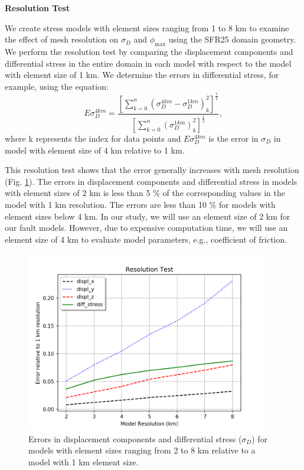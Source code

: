 \documentclass[draft,jgrga]{agutexSI2019}
\begin{document}
\begin{article}
\noindent\textbf{Resolution Test}
\vspace{10mm}

We create stress models with element sizes ranging from 1 to 8 km to examine the effect of mesh resolution on $\sigma_{D}$ and $\phi_{\max}$ using the SFR25 domain geometry. We perform the resolution test by comparing the displacement components and differential stress in the entire domain in each model with respect to the model with element size of 1 km. We determine the errors in differential stress, for example, using the equation:
%
\[
 E\sigma_{D}^{4km} = \frac{[\sum_{k=0}^n (\sigma_{D}^{4km} - \sigma_{D}^{1km})_{k}^2]^\frac{1}{2}}
{[\sum_{k=0}^n (\sigma_{D}^{1km})_{k}^2]^\frac{1}{2}},
\]
%
where k represents the index for data points and $ E\sigma_{D}^{4km} $ is the error in $\sigma_{D}$ in model with element size of 4 km relative to 1 km.

This resolution test shows that the error generally increases with mesh resolution (Fig. \ref{S1}). %
The errors in displacement components and differential stress in models with element sizes of 2 km is less than 5 \% of the corresponding values in the model with 1 km resolution. The errors are less than 10 \% for models with element sizes below 4 km. In our study, we will use an element size of 2 km for our fault models. However, due to expensive computation time, we will use an element size of 4 km to evaluate model parameters, e.g., coefficient of friction.
%
\begin{figure}[h!]
\includegraphics[width=25pc]{Figures/res_test_CSZ.png}
\caption{Errors in displacement components and differential stress ($\sigma_{D}$) for models with element sizes ranging from 2 to 8 km relative to a model with 1 km element size.}
\label{S1}
\end{figure}


\end{article}
\end{document}
